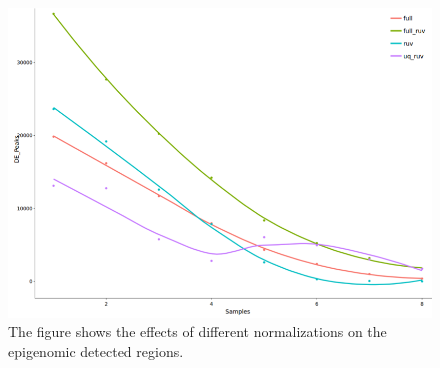 \begin{figure}[H]
\centering
\includegraphics[width=\textwidth, height=\textheight, keepaspectratio]{img/descan2/normalizations.png}
\caption[Normalizations applied to detected regions]{The figure shows the effects of different normalizations on the epigenomic detected regions.}
\label{fig:normalizationsdescan}
\centering
\end{figure}
